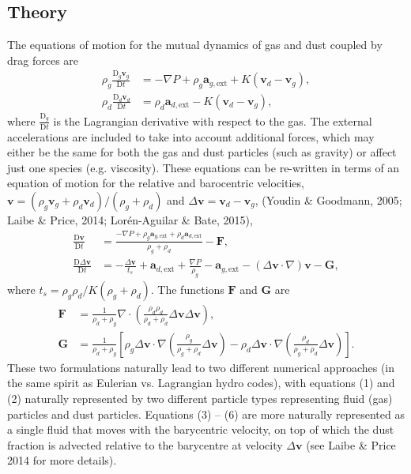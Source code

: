 \documentclass[a4paper]{article}
\renewcommand{\vec}[1]{\ensuremath{\mathbf{#1}}}
\begin{document}
\subsection{Theory}
The equations of motion for the mutual dynamics of gas and dust coupled by drag forces are
\begin{align}
\rho_g \frac{\mathrm{D}_g \vec{v}_g}{\mathrm{D} t} &= -\nabla P  + \rho_g \vec{a}_{g, \mathrm{ext}}
                                                     + K (\vec{v}_d - \vec{v}_g),  \\
\rho_d \frac{\mathrm{D}_d \vec{v}_d}{\mathrm{D} t} &= \rho_d \vec{a}_{d, \mathrm{ext}}
                                                     - K (\vec{v}_d - \vec{v}_g),
\end{align}
where $\frac{\mathrm{D}_g}{\mathrm{D} t}$ is the Lagrangian derivative with respect to the gas. The external accelerations are included to take into account additional forces, which may either be the same for both the gas and dust particles (such as gravity) or affect just one species (e.g. viscosity). These equations can be re-written in terms of an equation of motion for the relative and barocentric velocities, $\vec{v} = (\rho_g \vec{v}_g + \rho_d \vec{v}_d)/(\rho_g + \rho_d)$ and $\Delta \vec{v} = \vec{v}_d - \vec{v}_g$, (Youdin \& Goodmann, 2005; Laibe \& Price, 2014; Lor\'en-Aguilar \& Bate, 2015),
\begin{align}
\frac{\mathrm{D} \vec{v}}{\mathrm{D} t} &= \frac{-\nabla P + \rho_g \vec{a}_{g, \mathrm{ext}} + \rho_d \vec{a}_{d, \mathrm{ext}}}{\rho_g + \rho_d} - \vec{F}, \\
\frac{\mathrm{D} \Delta \vec{v}}{\mathrm{D} t} &= -  \frac{\Delta \vec{v}}{t_s}+  \vec{a}_{d, \mathrm{ext}} + \frac{\nabla P}{\rho_g}  - \vec{a}_{g, \mathrm{ext}} - (\Delta \vec{v} \cdot \nabla) \vec{v} - \vec{G},
\end{align}
where $t_s = \rho_g \rho_d / K(\rho_g + \rho_d)$. The functions $\vec{F}$ and $\vec{G}$ are
\begin{align}
\vec{F} &= \frac{1}{\rho_d + \rho_g} \nabla \cdot \left(\frac{\rho_d \rho_d}{\rho_d + \rho_d} \Delta \vec{v} \Delta \vec{v} \right), \\
\vec{G} &= \frac{1}{\rho_d + \rho_g} \left[
 \rho_g \Delta \vec{v} \cdot \nabla \left(\frac{\rho_g}{\rho_g + \rho_d} \Delta \vec{v} \right) -
 \rho_d \Delta \vec{v} \cdot \nabla \left(\frac{\rho_d}{\rho_g + \rho_d} \Delta \vec{v} \right) \right].
\end{align}
These two formulations naturally lead to two different numerical approaches (in the same spirit as Eulerian vs. Lagrangian hydro codes), with equations (1) and (2) naturally represented by two different particle types representing fluid (gas) particles and dust particles. Equations (3) -- (6) are more naturally represented as a single fluid that moves with the barycentric velocity, on top of which the dust fraction is advected relative to the barycentre at velocity $\Delta \vec{v}$ (see Laibe \& Price 2014 for more details).
\end{document}
